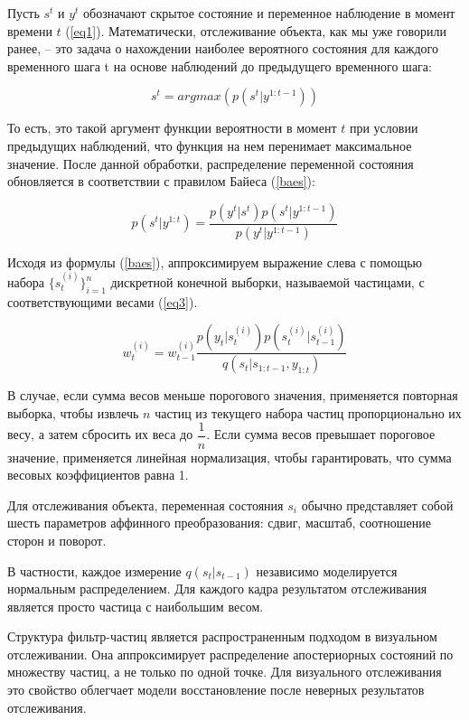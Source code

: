 Пусть $s^{t}$ и $y^{t}$ обозначают скрытое состояние и переменное наблюдение в момент времени $t$ (\ref{eq1}). Математически, отслеживание объекта, как мы уже говорили ранее, -- это задача о нахождении наиболее вероятного состояния для каждого временного шага t на основе наблюдений до предыдущего временного шага:

\begin{equation}\label{eq1}
    s^{t} = argmax(p(s^t|y^{1:t-1}))
\end{equation}

То есть, это такой аргумент функции вероятности в момент $t$ при условии предыдущих наблюдений, что функция на нем перенимает максимальное значение. После данной обработки, распределение переменной состояния обновляется в соответствии с правилом Байеса (\ref{baes}):

\begin{equation}\label{baes}
    p(s^t|y^{1:t}) = \dfrac{p(y^t|s^t)p(s^t|y^{1:t-1})}{p(y^t|y^{1:t-1})} 
\end{equation}

Исходя из формулы (\ref{baes}), аппроксимируем выражение слева с помощью набора $\{s^{(i)}_t\}^{n}_{i=1}$ дискретной конечной выборки, называемой частицами, с соответствующими весами (\ref{eq3}).

\begin{equation} \label{eq3}
    w^{(i)}_{t}=w^{(i)}_{t-1}\dfrac{p(y_t|s^{(i)}_t)p(s^{(i)}_t|s^{(i)}_{t-1})}{q(s_t|s_{1:t-1},y_{1:t})}
\end{equation}

В случае, если сумма весов меньше порогового значения, применяется повторная выборка, чтобы извлечь $n$ частиц из текущего набора частиц пропорционально их весу, а затем сбросить их веса до $\dfrac{1}{n}$. Если сумма весов превышает пороговое значение, применяется линейная нормализация, чтобы гарантировать, что сумма весовых коэффициентов равна 1. 

Для отслеживания объекта, переменная состояния $s_i$ обычно представляет собой шесть параметров аффинного преобразования: сдвиг, масштаб, соотношение сторон и поворот.

В частности, каждое измерение $q(s_t|s_{t-1})$ независимо моделируется нормальным распределением. Для каждого кадра результатом отслеживания является просто частица с наибольшим весом.

Структура фильтр-частиц является распространенным подходом в визуальном отслеживании. Она аппроксимирует распределение апостериорных состояний по множеству частиц, а не только по одной точке. Для визуального отслеживания это свойство облегчает модели восстановление после неверных результатов отслеживания.


